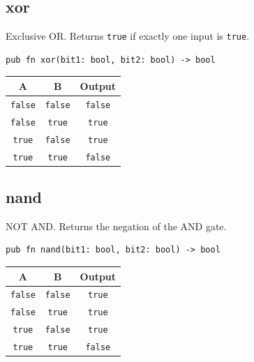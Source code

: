 \documentclass[a4paper,12pt]{report}
\begin{document}
\vspace{0.5cm}


\subsection*{xor}
Exclusive OR. Returns \texttt{true} if exactly one input is \texttt{true}.

\begin{lstlisting}
pub fn xor(bit1: bool, bit2: bool) -> bool
\end{lstlisting}

\begin{center}
\begin{tabular}{|c|c|c|}
\hline
\rowcolor{gray!20} \textbf{A} & \textbf{B} & \textbf{Output} \\ \hline
\texttt{false} & \texttt{false} & \texttt{false} \\ \hline
\texttt{false} & \texttt{true} & \texttt{true} \\ \hline
\texttt{true} & \texttt{false} & \texttt{true} \\ \hline
\texttt{true} & \texttt{true} & \texttt{false} \\ \hline
\end{tabular}
\end{center}

\vspace{2.7cm}

\subsection*{nand}
NOT AND. Returns the negation of the AND gate.

\begin{lstlisting}
pub fn nand(bit1: bool, bit2: bool) -> bool
\end{lstlisting}

\begin{center}
\begin{tabular}{|c|c|c|}
\hline
\rowcolor{gray!20} \textbf{A} & \textbf{B} & \textbf{Output} \\ \hline
\texttt{false} & \texttt{false} & \texttt{true} \\ \hline
\texttt{false} & \texttt{true} & \texttt{true} \\ \hline
\texttt{true} & \texttt{false} & \texttt{true} \\ \hline
\texttt{true} & \texttt{true} & \texttt{false} \\ \hline
\end{tabular}
\end{center}
\end{document}
